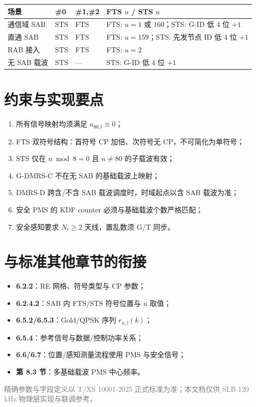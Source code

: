 \documentclass[11pt,a4paper]{ctexart}
\begin{document}
\begin{table}[h]
\centering
\small
\begin{tabular}{llll}
\toprule
\textbf{场景} & \textbf{\#0} & \textbf{\#1,\#2} & \textbf{FTS $u$ / STS $u$} \\
\midrule
通信域 SAB & STS & FTS & FTS: $u{=}1$ 或 $160$；STS: G-ID 低 4 位 $+1$ \\
直通 SAB & STS & FTS & FTS: $u{=}159$；STS: 先发节点 ID 低 4 位 $+1$ \\
RAB 接入 & STS & FTS & FTS: $u{=}2$ \\
无 SAB 载波 & STS & --- & STS: G-ID 低 4 位 $+1$ \\
\bottomrule
\end{tabular}
\end{table}

\section{约束与实现要点}

\begin{enumerate}[nosep]
  \item 所有信号映射均须满足 $a_{80,l} \equiv 0$；
  \item FTS 双符号结构：首符号 CP 加倍、次符号无 CP，不可简化为单符号；
  \item STS 仅在 $n \bmod 8 = 0$ 且 $n \neq 80$ 的子载波有效；
  \item G-DMRS-C 不在无 SAB 的基础载波上映射；
  \item DMRS-D 跨含/不含 SAB 载波调度时，时域起点以含 SAB 载波为准；
  \item 安全 PMS 的 KDF counter 必须与基础载波个数严格匹配；
  \item 安全感知要求 $N_t \geq 2$ 天线，置乱数须 G/T 同步。
\end{enumerate}

\section{与标准其他章节的衔接}

\begin{itemize}[nosep]
  \item \textbf{6.2.2}：RE 网格、符号类型与 CP 参数；
  \item \textbf{6.2.4.2}：SAB 内 FTS/STS 符号位置与 $u$ 取值；
  \item \textbf{6.5.2/6.5.3}：Gold/QPSK 序列 $r_{n,l}(k)$；
  \item \textbf{6.5.4}：参考信号与数据/控制功率关系；
  \item \textbf{6.6/6.7}：位置/感知测量流程使用 PMS 与安全信号；
  \item \textbf{第 8.3 节}：多基础载波 PMS 中心频率。
\end{itemize}

\vfill
\begin{center}
\small\textcolor{gray}{精确参数与字段定义以 T/XS 10001-2025 正式标准为准；本文档仅供 SLB 120\,kHz 物理层实现与联调参考。}
\end{center}
\end{document}
